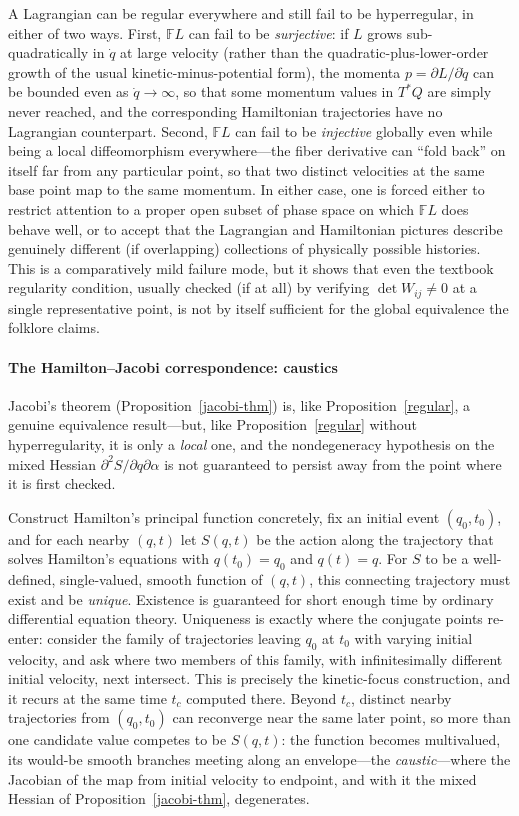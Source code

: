 A Lagrangian can be regular everywhere and still fail to be hyperregular, in
either of two ways. First, $\mathbb{F}L$ can fail to be \emph{surjective}: if
$L$ grows sub-quadratically in $\dot q$ at large velocity (rather than the
quadratic-plus-lower-order growth of the usual kinetic-minus-potential form),
the momenta $p=\partial L/\partial\dot q$ can be bounded even as $\dot
q\to\infty$, so that some momentum values in $T^*Q$ are simply never reached,
and the corresponding Hamiltonian trajectories have no Lagrangian counterpart.
Second, $\mathbb{F}L$ can fail to be \emph{injective} globally even while being
a local diffeomorphism everywhere---the fiber derivative can ``fold back'' on
itself far from any particular point, so that two distinct velocities at the
same base point map to the same momentum. In either case, one is forced either
to restrict attention to a proper open subset of phase space on which
$\mathbb{F}L$ does behave well, or to accept that the Lagrangian and
Hamiltonian pictures describe genuinely different (if overlapping) collections
of physically possible histories. This is a comparatively mild failure mode,
 but it shows that even the
textbook regularity condition, usually checked (if at all) by verifying $\det
W_{ij}\neq 0$ at a single representative point, is not by itself sufficient for
the global equivalence the folklore claims.

\paragraph{The Hamilton--Jacobi correspondence: caustics}
Jacobi's theorem (Proposition~\ref{jacobi-thm}) is, like
Proposition~\ref{regular}, a genuine equivalence result---but, like
Proposition~\ref{regular} without hyperregularity, it is only a
\emph{local} one, and the nondegeneracy hypothesis on the mixed Hessian
$\partial^2S/\partial q\partial\alpha$ is not guaranteed to persist away from
the point where it is first checked.

Construct Hamilton's principal function concretely,
fix an initial event $(q_0,t_0)$, and for each
nearby $(q,t)$ let $S(q,t)$ be the action along the trajectory that solves
Hamilton's equations with $q(t_0)=q_0$ and $q(t)=q$. For $S$ to be a
well-defined, single-valued, smooth function of $(q,t)$, this connecting
trajectory must exist and be \emph{unique}. Existence is guaranteed for short
enough time by ordinary differential equation theory. Uniqueness is exactly
where the conjugate points re-enter: consider the
family of trajectories leaving $q_0$ at $t_0$ with varying initial velocity,
and ask where two members of this family, with infinitesimally different
initial velocity, next intersect. This is precisely the kinetic-focus
construction, and it recurs at the same time $t_c$
computed there. Beyond $t_c$, distinct nearby trajectories from $(q_0,t_0)$ can
reconverge near the same later point, so more than one candidate value competes
to be $S(q,t)$: the function becomes multivalued, its would-be smooth branches
meeting along an envelope---the \emph{caustic}---where the Jacobian of the map
from initial velocity to endpoint, and with it the mixed Hessian of
Proposition~\ref{jacobi-thm}, degenerates.

